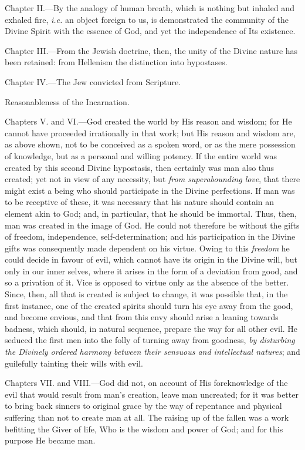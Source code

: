Chapter II.—By the analogy of human breath, which is nothing but inhaled and exhaled fire, \emph{i.e.} an object foreign to us, is demonstrated the community of the Divine Spirit with the essence of God, and yet the independence of Its existence.

Chapter III.—From the Jewish doctrine, then, the unity of the Divine nature has been retained: from Hellenism the distinction into hypostases.

Chapter IV.—The Jew convicted from Scripture.

Reasonableness of the Incarnation.

Chapters V. and VI.—God created the world by His reason and wisdom; for He cannot have proceeded irrationally in that work; but His reason and wisdom are, as above shown, not to be conceived as a spoken word, or as the mere possession of knowledge, but as a personal and willing potency. If the entire world was created by this second Divine hypostasis, then certainly was man also thus created; yet not in view of any necessity, but \emph{from superabounding love}, that there might exist a being who should participate in the Divine perfections. If man was to be receptive of these, it was necessary that his nature should contain an element akin to God; and, in particular, that he should be immortal. Thus, then, man was created in the image of God. He could not therefore be without the gifts of freedom, independence, self-determination; and his participation in the Divine gifts was consequently made dependent on his virtue. Owing to this \emph{freedom} he could decide in favour of evil, which cannot have its origin in the Divine will, but only in our inner selves, where it arises in the form of a deviation from good, and so a privation of it. Vice is opposed to virtue only as the absence of the better. Since, then, all that is created is subject to change, it was possible that, in the first instance, one of the created spirits should turn his eye away from the good, and become envious, and that from this envy should arise a leaning towards badness, which should, in natural sequence, prepare the way for all other evil. He seduced the first men into the folly of turning away from goodness, \emph{by disturbing the Divinely ordered harmony between their sensuous and intellectual natures}; and guilefully tainting their wills with evil.

Chapters VII. and VIII.—God did not, on account of His foreknowledge of the evil that would result from man’s creation, leave man uncreated; for it was better to bring back sinners to original grace by the way of repentance and physical suffering than not to create man at all. The raising up of the fallen was a work befitting the Giver of life, Who is the wisdom and power of God; and for this purpose He became man.

